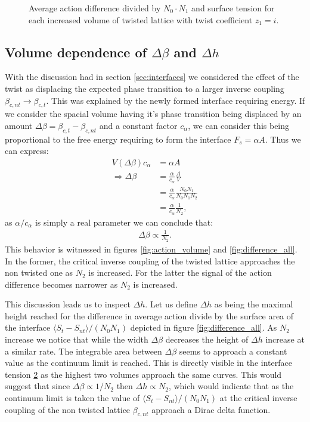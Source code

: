 \documentclass[english,twoside,openright]{UH_TCM_MSc}
\begin{document}
\begin{figure}[!htb]
\begin{subfigure}[t]{\textwidth}
        \caption{}
        \label{fig:integral_all}
    \end{subfigure}
    \caption{Average action difference divided by $N_0\cdot N_1$ and surface tension for each increased volume of twisted lattice with twist coefficient $z_1=i$.}
\end{figure}

\subsection{Volume dependence of $\Delta \beta$ and $\Delta h$}

With the discussion had in section \ref{sec:interfaces} we considered the effect of the twist as displacing the expected phase transition to a larger inverse coupling $\beta_{c,nt} \rightarrow\beta_{c,t}$. This was explained by the newly formed interface requiring energy. If we consider the spacial volume having it's phase transition being displaced by an amount $\Delta \beta = \beta_{c,t}-\beta_{c,nt}$ and a constant factor $c_\alpha$, we can consider this being proportional to the free energy requiring to form the interface $F_s = \alpha A$. Thus we can express:
\begin{align}
    V(\Delta\beta) c_\alpha &= \alpha A \\
    \Rightarrow \Delta \beta &= \frac{\alpha}{c_\alpha}\frac{A}{V} \\
    &= \frac{\alpha}{c_\alpha}\frac{N_0 N_1 }{N_0 N_1 N_2} \\
    &= \frac{\alpha}{c_\alpha}\frac{1}{N_2},
\end{align}
as $\alpha/c_\alpha$ is simply a real parameter we can conclude that:
\begin{align}
    \Delta \beta \propto \frac{1}{N_2}.
\end{align}
This behavior is witnessed in figures \ref{fig:action_volume} and \ref{fig:difference_all}. In the former, the critical inverse coupling of the twisted lattice approaches the non twisted one as $N_2$ is increased. For the latter the signal of the action difference becomes narrower as $N_2$ is increased. 

This discussion leads us to inspect $\Delta h$. Let us define $\Delta h$ as being the maximal height reached for the difference in average action divide by the surface area of the interface $\langle S_t - S_{nt} \rangle / (N_0N_1)$ depicted in figure \ref{fig:difference_all}. As $N_2$ increase we notice that while the width $\Delta \beta$ decreases the height of $\Delta h$ increase at a similar rate. The integrable area between $\Delta \beta$ seems to approach a constant value as the continuum limit is reached. This is directly visible in the interface tension \ref{fig:integral_all} as the highest two volumes approach the same curves. This would suggest that since $\Delta \beta \propto 1/N_2$ then $\Delta h \propto N_2$, which would indicate that as the continuum limit is taken the value of $\langle S_t - S_{nt} \rangle / (N_0N_1)$ at the critical inverse coupling of the non twisted lattice $\beta_{c,nt}$ approach a Dirac delta function.
\end{document}
